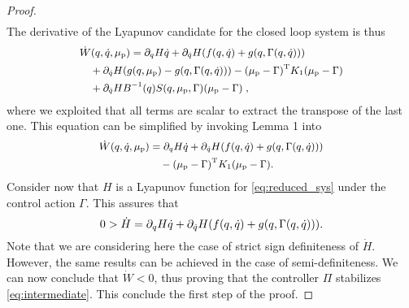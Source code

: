 \begin{proof}
\begin{equation*}
\begin{split}
		\end{split}
	\end{equation*}
	The derivative of the Lyapunov candidate for the closed loop system is thus
	\begin{equation*}\small
	\begin{split}
	&\dot{W}(q,\dot{q},\mu_\mathrm{p}) =  \partial_{q} H \dot{q} + \partial_{\dot{q}} H (f(q,\dot{q}) + g(q,\Gamma(q,\dot{q}))) \\
	&\quad + \partial_{\dot{q}} H (g(q,\mu_\mathrm{p}) - g(q,\Gamma(q,\dot{q}))) - (\mu_\mathrm{p} - \Gamma)^{\mathrm{T}}K_1(\mu_\mathrm{p} - \Gamma) \\
	&\quad +  \partial_{\dot{q}} H B^{-1}(q) S(q,\mu_\mathrm{p},\Gamma) (\mu_\mathrm{p} - \Gamma)\;,
	\end{split}
	\end{equation*}
	where we exploited that all terms are scalar to extract the transpose of the last one. This equation can be  simplified by invoking Lemma 1 into
	\begin{equation}\small
	\begin{split}
	\dot{W}(q,\dot{q},\mu_\mathrm{p}) &=  \partial_{q} H \dot{q} + \partial_{\dot{q}} H (f(q,\dot{q}) + g(q,\Gamma(q,\dot{q}))) \\
	&\quad - (\mu_\mathrm{p} - \Gamma)^{\mathrm{T}}K_1(\mu_\mathrm{p} - \Gamma).
	\end{split}
	\end{equation}
	Consider now that $H$ is a Lyapunov function for \eqref{eq:reduced_sys} under the control action $\Gamma$. This assures that
	\begin{equation}\small
		0 > \dot{H} = \partial_{q} H \dot{q} + \partial_{\dot{q}} H (f(q,\dot{q}) + g(q,\Gamma(q,\dot{q}))).
	\end{equation}
	Note that we are considering here the case of strict sign definiteness of $\dot{H}$. However, the same results can be achieved in the case of semi\--definiteness.
	We can now conclude that $\dot{W} < 0$, thus proving that the controller $\Pi$ stabilizes \eqref{eq:intermediate}. This conclude the first step of the proof.
	

\end{proof}

